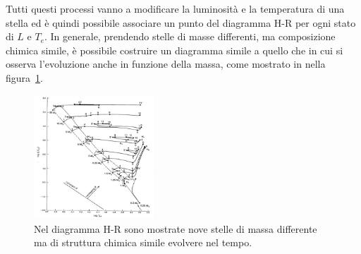 Tutti questi processi vanno a modificare la luminosità e la temperatura di una stella ed è quindi possibile associare un punto del diagramma H-R per ogni stato di $L$ e $T_e$. In generale, prendendo stelle di masse differenti, ma composizione chimica simile, è possibile costruire un diagramma simile a quello che in cui si osserva l'evoluzione anche in funzione della massa, come mostrato in nella figura~\ref{fig:evo}.
\begin{figure}
    \centering
    \includegraphics[width=0.4\textwidth]{immagini/evo.png}
    \caption{Nel diagramma H-R sono mostrate nove stelle di massa differente ma di struttura chimica simile evolvere nel tempo.}\label{fig:evo}
\end{figure}